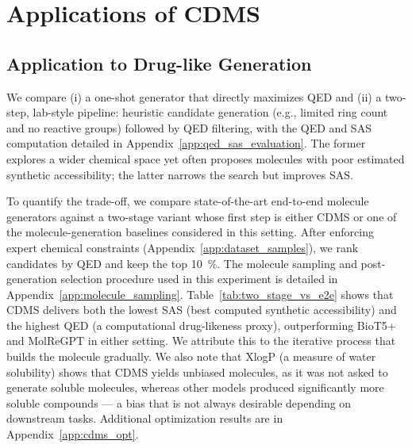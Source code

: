 \documentclass[10pt]{article} %
\begin{document}
\section{Applications of CDMS}
    \subsection{Application to Drug-like Generation}
\label{sec:applications_in_drug}

We compare (i) a one-shot generator that directly maximizes QED and (ii) a two-step, lab-style pipeline: heuristic candidate generation (e.g., limited ring count and no reactive groups) followed by QED filtering, with the QED and SAS computation detailed in Appendix~\ref{app:qed_sas_evaluation}. The former explores a wider chemical space yet often proposes molecules with poor estimated synthetic accessibility; the latter narrows the search but improves SAS.

To quantify the trade-off, we compare state-of-the-art end-to-end molecule generators against a two-stage variant whose first step is either CDMS or one of the molecule-generation baselines considered in this setting. After enforcing expert chemical constraints (Appendix~\ref{app:dataset_samples}), we rank candidates by QED and keep the top 10~\%.  The molecule sampling and post-generation selection procedure used in this experiment is detailed in Appendix~\ref{app:molecule_sampling}. Table~\ref{tab:two_stage_vs_e2e} shows that CDMS delivers both the lowest SAS (best computed synthetic accessibility) and the highest QED (a computational drug-likeness proxy), outperforming BioT5+ and MolReGPT in either setting. We attribute this to the iterative process that builds the molecule gradually. We also note that XlogP (a measure of water solubility) shows that CDMS yields unbiased molecules, as it was not asked to generate soluble molecules, whereas other models produced significantly more soluble compounds — a bias that is not always desirable depending on downstream tasks. Additional optimization results are in Appendix~\ref{app:cdms_opt}.
\end{document}
